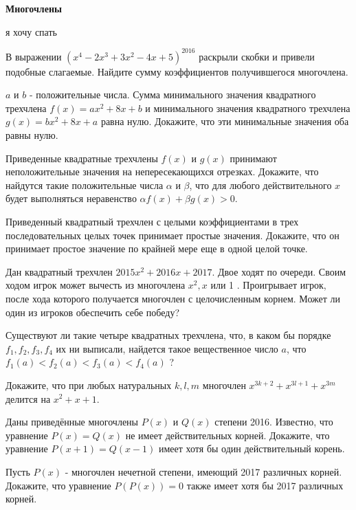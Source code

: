 \centerline{\bf \Huge Многочлены}

\begin{flushright}
        \scriptsize{я хочу спать}
\end{flushright}

В выражении $\left(x^4-2 x^3+3 x^2-4 x+5\right)^{2016}$ раскрыли скобки и привели подобные слагаемые. Найдите сумму коэффициентов получившегося многочлена.

$a$ и $b$ - положительные числа. Сумма минимального значения квадратного трехчлена $f(x)=a x^2+8 x+b$ и минимального значения квадратного трехчлена $g(x)=b x^2+8 x+a$ равна нулю. Докажите, что эти минимальные значения оба равны нулю.

Приведенные квадратные трехчлены $f(x)$ и $g(x)$ принимают неположительные значения на непересекающихся отрезках. Докажите, что найдутся такие положительные числа $\alpha$ и $\beta$, что для любого действительного $x$ будет выполняться неравенство $\alpha f(x)+\beta g(x)>0$.

Приведенный квадратный трехчлен с целыми коэффициентами в трех последовательных целых точек принимает простые значения. Докажите, что он принимает простое значение по крайней мере еще в одной целой точке.

Дан квадратный трехчлен $2015 x^2+2016 x+2017$. Двое ходят по очереди. Своим ходом игрок может вычесть из многочлена $x^2, x$ или 1 . Проигрывает игрок, после хода которого получается многочлен с целочисленным корнем. Может ли один из игроков обеспечить себе победу?

Существуют ли такие четыре квадратных трехчлена, что, в каком бы порядке $f_1, f_2, f_3, f_4$ их ни выписали, найдется такое вещественное число $a$, что $f_1(a)<f_2(a)<f_3(a)<f_4(a)$ ?

Докажите, что при любых натуральных $k, l, m$ многочлен $x^{3 k+2}+x^{3 l+1}+ x^{3 m}$ делится на $x^2+x+1$.

Даны приведённые многочлены $P(x)$ и $Q(x)$ степени 2016. Известно, что уравнение $P(x)=Q(x)$ не имеет действительных корней. Докажите, что уравнение $P(x+1)=Q(x-1)$ имеет хотя бы один действительный корень.

Пусть $P(x)$ - многочлен нечетной степени, имеющий 2017 различных корней. Докажите, что уравнение $P(P(x))=0$ также имеет хотя бы 2017 различных корней.